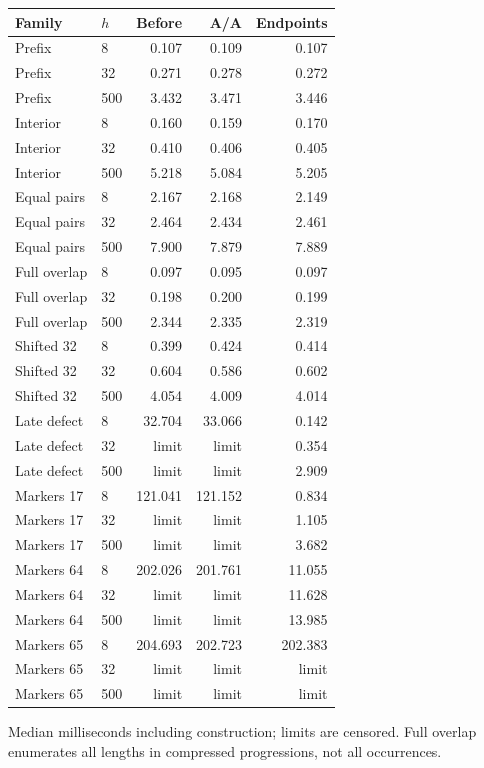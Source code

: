 \begin{center}\small
\begin{tabular}{@{}llrrr@{}}
\toprule
Family & $h$ & Before & A/A & Endpoints \\
\midrule
Prefix & 8 & 0.107 & 0.109 & 0.107 \\
Prefix & 32 & 0.271 & 0.278 & 0.272 \\
Prefix & 500 & 3.432 & 3.471 & 3.446 \\
Interior & 8 & 0.160 & 0.159 & 0.170 \\
Interior & 32 & 0.410 & 0.406 & 0.405 \\
Interior & 500 & 5.218 & 5.084 & 5.205 \\
Equal pairs & 8 & 2.167 & 2.168 & 2.149 \\
Equal pairs & 32 & 2.464 & 2.434 & 2.461 \\
Equal pairs & 500 & 7.900 & 7.879 & 7.889 \\
Full overlap & 8 & 0.097 & 0.095 & 0.097 \\
Full overlap & 32 & 0.198 & 0.200 & 0.199 \\
Full overlap & 500 & 2.344 & 2.335 & 2.319 \\
Shifted 32 & 8 & 0.399 & 0.424 & 0.414 \\
Shifted 32 & 32 & 0.604 & 0.586 & 0.602 \\
Shifted 32 & 500 & 4.054 & 4.009 & 4.014 \\
Late defect & 8 & 32.704 & 33.066 & 0.142 \\
Late defect & 32 & limit & limit & 0.354 \\
Late defect & 500 & limit & limit & 2.909 \\
Markers 17 & 8 & 121.041 & 121.152 & 0.834 \\
Markers 17 & 32 & limit & limit & 1.105 \\
Markers 17 & 500 & limit & limit & 3.682 \\
Markers 64 & 8 & 202.026 & 201.761 & 11.055 \\
Markers 64 & 32 & limit & limit & 11.628 \\
Markers 64 & 500 & limit & limit & 13.985 \\
Markers 65 & 8 & 204.693 & 202.723 & 202.383 \\
Markers 65 & 32 & limit & limit & limit \\
Markers 65 & 500 & limit & limit & limit \\
\bottomrule
\end{tabular}
\end{center}
Median milliseconds including construction; limits are censored. Full overlap enumerates all lengths in compressed progressions, not all occurrences.
